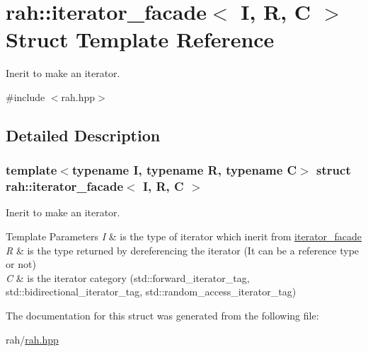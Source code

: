 \hypertarget{structrah_1_1iterator__facade}{}\section{rah\+::iterator\+\_\+facade$<$ I, R, C $>$ Struct Template Reference}
\label{structrah_1_1iterator__facade}


Inerit to make an iterator.  




{\ttfamily \#include $<$rah.\+hpp$>$}



\subsection{Detailed Description}
\subsubsection*{template$<$typename I, typename R, typename C$>$\newline
struct rah\+::iterator\+\_\+facade$<$ I, R, C $>$}

Inerit to make an iterator. 


\begin{DoxyTemplParams}{Template Parameters}
{\em I} & is the type of iterator which inerit from \mbox{\hyperlink{structrah_1_1iterator__facade}{iterator\+\_\+facade}} \\
\hline
{\em R} & is the type returned by dereferencing the iterator (It can be a reference type or not) \\
\hline
{\em C} & is the iterator category (std\+::forward\+\_\+iterator\+\_\+tag, std\+::bidirectional\+\_\+iterator\+\_\+tag, std\+::random\+\_\+access\+\_\+iterator\+\_\+tag) \\
\hline
\end{DoxyTemplParams}


The documentation for this struct was generated from the following file\+:\begin{DoxyCompactItemize}
\item 
rah/\mbox{\hyperlink{rah_8hpp}{rah.\+hpp}}\end{DoxyCompactItemize}
